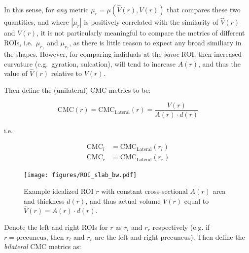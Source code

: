 \documentclass{article}
\newcommand{\note}[2][cyan]{\textbf{NOTE}: \textcolor{#1}{#2}}
\begin{document}
In this sense, for \emph{any} metric \(\mu_r = \mu(\hat{V}(r), V(r))\) that
compares these two quantities, and where \(|\mu_r|\) is positively correlated
with the similarity of \(\hat{V}(r)\) and \(V(r)\), it is not particularly
meaningful to compare the metrics of different ROIs, i.e.\ \(\mu_{r_1}\) and
\(\mu_{r_2}\), as there is little reason to expect any broad similiary in the
shapes. However, for comparing indiduals at the \emph{same} ROI, then
increased curvature (e.g.\ gyration, sulcation), will tend to increase
\(A(r)\), and thus the value of \(\hat{V}(r)\) relative to \(V(r)\).

Then define the (unilateral) CMC metrics to be:

\begin{equation}
\text{CMC}(r) = \text{CMC}_{\text{Lateral}}(r) = \frac{V(r)}{A(r) \cdot d(r)}
\end{equation}

i.e.\

\begin{align}
\label{eq:cmc-laterals}
\text{CMC}_l &= \text{CMC}_{\text{Lateral}}(r_l) \\
\text{CMC}_r &= \text{CMC}_{\text{Lateral}}(r_r)
\end{align}



\begin{figure}
	\centering
	\texttt{[image: figures/ROI\_slab\_bw.pdf]}
	\caption{Example idealized ROI \(r\) with constant cross-sectional \(A(r)\)
	area and thickness \(d(r)\), and thus actual volume \(V(r)\) equal to
	\(\hat{V}(r) = A(r) \cdot d(r)\).}
	\label{fig:slab}
\end{figure}

%




Denote the left and right ROIs for \(r\) as \(r_l\) and \(r_r\) respectively
(e.g\@. if \(r=\text{precuneus}\), then \(r_l\) and \(r_r\) are the left and
right precuneus). Then define the \emph{bilateral} CMC metrics as:
\end{document}
